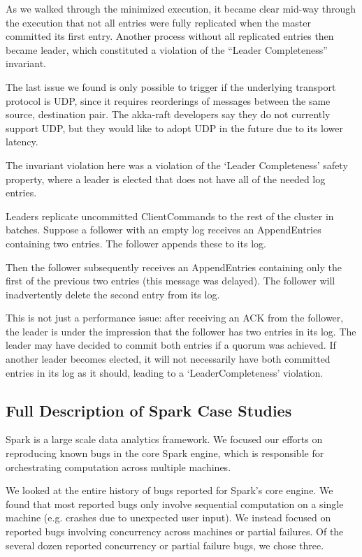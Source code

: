 As we walked through the minimized execution, it
became clear mid-way through the execution that not all
entries were fully replicated when the master committed
its first entry. Another process without all replicated entries
then became leader, which constituted a violation
of the ``Leader Completeness'' invariant.

 The last issue we found is only possible to
 trigger if the underlying transport protocol is UDP, since it requires reorderings of messages between the same source, destination pair.
 The akka-raft developers say they do not currently support UDP, but they
 would like to adopt UDP in the future due to its lower latency.

The invariant violation here was a violation of the `Leader Completeness' safety property,
 where a leader is elected that does not have all of the needed log entries.

Leaders replicate uncommitted ClientCommands to the rest of the cluster in batches. Suppose a follower with an empty log receives an AppendEntries containing two entries. The follower appends these to its log.

Then the follower subsequently receives an AppendEntries containing only the first of the previous two entries (this message was delayed). The follower will inadvertently delete the second entry from its log.

This is not just a performance issue: after receiving an ACK from the follower, the leader is under the
 impression that the follower has two entries in its log.
 The leader may have decided to commit both entries if a quorum was achieved.
 If another leader becomes elected, it will not necessarily have both
 committed entries in its log as it should, leading to a `LeaderCompleteness'
 violation.


\subsection{Full Description of Spark Case Studies}
\label{app:spark_case_studies}

Spark is a large scale data analytics framework. We focused our efforts on
reproducing known bugs in the core Spark engine, which is responsible for
orchestrating computation across multiple machines.

We looked at the entire history of bugs reported for Spark's core engine. We found that most reported bugs only involve sequential
computation on a single machine (e.g. crashes due to unexpected user input).
We instead focused on reported bugs involving concurrency across machines or
partial failures. Of the several dozen reported concurrency or partial failure
bugs, we chose three.

